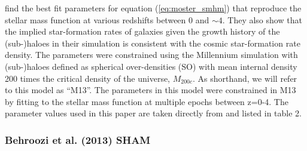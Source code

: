 \documentclass[a4paper,fleqn,usenatbib]{mnras}
\begin{document}
\citet{Moster:2013ab} find the best fit parameters for equation (\ref{eq:moster_smhm}) that reproduce the stellar mass function at various redshifts between 0 and $\sim 4$.  They also show that the implied star-formation rates of galaxies given the growth history of the (sub-)haloes in their simulation is consistent with the cosmic star-formation rate density.  The parameters were constrained using the Millennium simulation with (sub-)haloes defined as spherical over-densities (SO) with mean internal density 200 times the critical density of the universe, $M_{200c}$.   As shorthand, we will refer to this model as ``M13''.  The parameters in this model were constrained in M13 by fitting to the stellar mass function at multiple epochs between z=0-4.  The parameter values used in this paper are taken directly from \citet{Moster:2013ab} and listed in table 2.
      
\subsubsection{Behroozi et al. (2013) SHAM}
\label{sec:b13}
\end{document}
